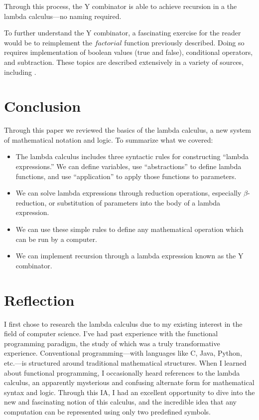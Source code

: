 \documentclass[twocolumn,titlepage,12pt]{article}
\begin{document}
Through this process, the Y combinator is able to achieve recursion in a the lambda calculus---no naming required.

To further understand the Y combinator, a fascinating exercise for the reader would be to reimplement the $factorial$ function previously described. Doing so requires implementation of boolean values (true and false), conditional operators, and subtraction. These topics are described extensively in a variety of sources, including \cite{stanfordlc}\cite{cornelllc}.

\section{Conclusion}
Through this paper we reviewed the basics of the lambda calculus, a new system of mathematical notation and logic. To summarize what we covered:
\begin{itemize}
  \item{The lambda calculus includes three syntactic rules for constructing ``lambda expressions.'' We can define variables, use ``abstractions'' to define lambda functions, and use ``application'' to apply those functions to parameters.}
  \item{We can solve lambda expressions through reduction operations, especially $\beta$-reduction, or substitution of parameters into the body of a lambda expression.}
  \item{We can use these simple rules to define any mathematical operation which can be run by a computer.}
  \item{We can implement recursion through a lambda expression known as the Y combinator.}
\end{itemize}


\section{Reflection}
I first chose to research the lambda calculus due to my existing interest in the field of computer science. I've had past experience with the functional programming paradigm, the study of which was a truly transformative experience. Conventional programming---with languages like C, Java, Python, etc.---is structured around traditional mathematical structures. When I learned about functional programming, I occasionally heard references to the lambda calculus, an apparently mysterious and confusing alternate form for mathematical syntax and logic.
Through this IA, I had an excellent opportunity to dive into the new and fascinating notion of this calculus, and the incredible idea that any computation can be represented using only two predefined symbols.


\end{document}
